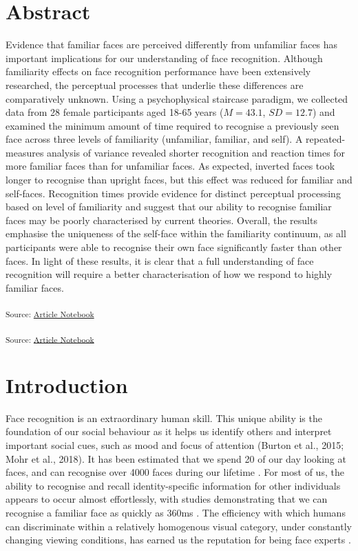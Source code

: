 \documentclass[
  10pt,
  letterpaper,
]{article}
\begin{document}
\section*{Abstract}
Evidence that familiar faces are perceived differently from unfamiliar
faces has important implications for our understanding of face
recognition. Although familiarity effects on face recognition
performance have been extensively researched, the perceptual processes
that underlie these differences are comparatively unknown. Using a
psychophysical staircase paradigm, we collected data from 28 female
participants aged 18-65 years (\(M = 43.1\), \(SD = 12.7\)) and examined
the minimum amount of time required to recognise a previously seen face
across three levels of familiarity (unfamiliar, familiar, and self). A
repeated-measures analysis of variance revealed shorter recognition and
reaction times for more familiar faces than for unfamiliar faces. As
expected, inverted faces took longer to recognise than upright faces,
but this effect was reduced for familiar and self-faces. Recognition
times provide evidence for distinct perceptual processing based on level
of familiarity and suggest that our ability to recognise familiar faces
may be poorly characterised by current theories. Overall, the results
emphasise the uniqueness of the self-face within the familiarity
continuum, as all participants were able to recognise their own face
significantly faster than other faces. In light of these results, it is
clear that a full understanding of face recognition will require a
better characterisation of how we respond to highly familiar faces.


\linenumbers
\textsubscript{Source:
\href{https://deborahapthorp.github.io/SelfFaceManuscript/index-preview.html}{Article
Notebook}}

\textsubscript{Source:
\href{https://deborahapthorp.github.io/SelfFaceManuscript/index-preview.html}{Article
Notebook}}

\section{Introduction}\label{introduction}

Face recognition is an extraordinary human skill. This unique ability is
the foundation of our social behaviour as it helps us identify others
and interpret important social cues, such as mood and focus of attention
(Burton et al., 2015; Mohr et al., 2018). It has been estimated that we
spend 20\(%
\) of our day looking at faces, and can recognise over 4000 faces during
our lifetime \citep{jenkins2018a, oruc2019a}. For most of us, the
ability to recognise and recall identity-specific information for other
individuals appears to occur almost effortlessly, with studies
demonstrating that we can recognise a familiar face as quickly as 360ms
\citep{besson2016a, blauch2021a, oruc2019a, ramon2016a}. The efficiency
with which humans can discriminate within a relatively homogenous visual
category, under constantly changing viewing conditions, has earned us
the reputation for being face experts
\citep{collins2018a, dobs2019a, kramer2017a, quek2021a}.
\end{document}
